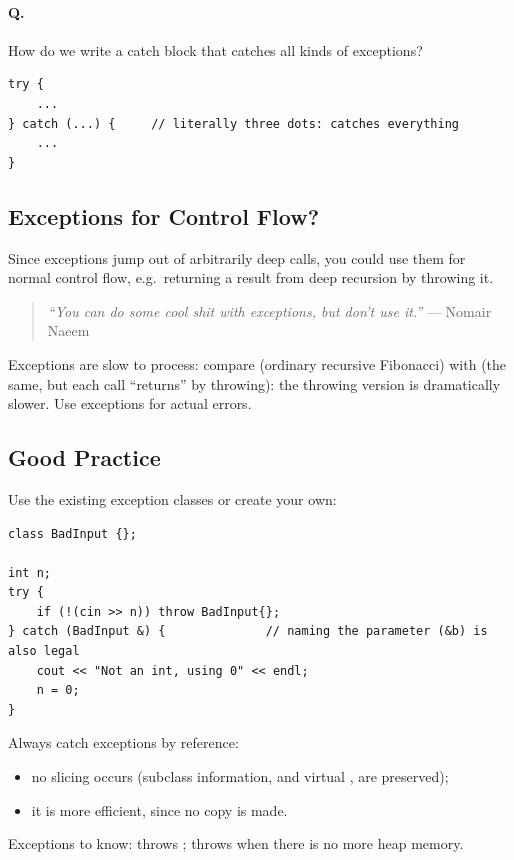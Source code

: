 \paragraph{Q.} How do we write a catch block that catches all kinds of
exceptions?
\begin{lstlisting}[style=cpp]
try {
    ...
} catch (...) {     // literally three dots: catches everything
    ...
}
\end{lstlisting}

\subsection{Exceptions for Control Flow?}
Since exceptions jump out of arbitrarily deep calls, you could use them for
normal control flow, e.g.\ returning a result from deep recursion by throwing it.
\begin{quote}
\textit{``You can do some cool shit with exceptions, but don't use it.''}
--- Nomair Naeem
\end{quote}
Exceptions are slow to process: compare  (ordinary recursive
Fibonacci) with  (the same, but each call ``returns'' by
throwing): the throwing version is dramatically slower. Use exceptions for
actual errors.

\subsection{Good Practice}
Use the existing exception classes or create your own:
\begin{lstlisting}[style=cpp]
class BadInput {};

int n;
try {
    if (!(cin >> n)) throw BadInput{};
} catch (BadInput &) {              // naming the parameter (&b) is also legal
    cout << "Not an int, using 0" << endl;
    n = 0;
}
\end{lstlisting}
\begin{important}[Advice]
Always catch exceptions by reference:
\begin{itemize}
  \item no slicing occurs (subclass information, and virtual ,
        are preserved);
  \item it is more efficient, since no copy is made.
\end{itemize}
\end{important}

Exceptions to know:  throws ;
 throws  when there is no more heap memory.

